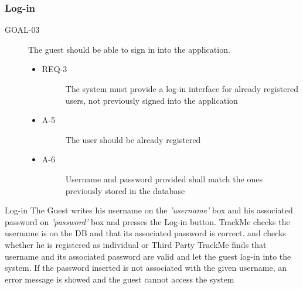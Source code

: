 \documentclass[a4paper]{article}
\newcommand{\requirement}{\ding{229}}%
\begin{document}
        
        \subsubsection{Log-in}
        
        
        \begin{description}
        	\item[GOAL-03] The guest should be able to sign in into the application. 
            	\begin{itemize}
            	    \item[\requirement]
                	\begin{description}
                	\item[REQ-3] The system must provide a log-in interface for already registered users, not previously signed into the application 
                	\end{description}
                	\item
                	\begin{description}
                	\item[A-5] The user should be already registered
                	\end{description}
                	\item
                	\begin{description}
                	\item[A-6] Username and password provided shall match the ones previously stored in the database
                	\end{description}
                	\end{itemize}
        \end{description}
        
        
        \begin{usecase}{Log-in}
              {The Guest writes his username on the \textit{'username'} box and his associated password on \textit{'password'} box and presses the Log-in button.}
              {TrackMe checks the username is on the DB and that its associated password is correct. and checks whether he is  registered as individual or Third Party}
              {TrackMe finds that username and its associated password are valid and let the guest log-in into the system.}
        {If the password inserted is not associated with the given username, an error message is showed and the guest cannot access the system}
        \end{usecase}
        
\end{document}
